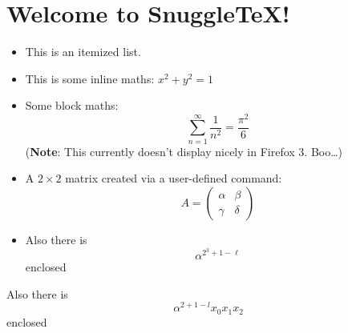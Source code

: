\section*{Welcome to SnuggleTeX!}

\begin{itemize}
  \item This is an itemized list.

  \item This is some inline maths: $x^2+ y^2 = 1$

  \item Some block maths:
        \[ \sum_{n=1}^\infty \frac{1}{n^2} = \frac{\pi^2}{6} \]
        (\textbf{Note}: This currently doesn't display nicely in Firefox 3. Boo\ldots)

  \item A $2\times 2$ matrix created via a user-defined command:
        \newcommand{\mat}[4]{\left( \begin{array}{cc} #1 & #2 \\ #3 & #4 \end{array} \right)}
        \[ A = \mat{\alpha}{\beta}{\gamma}{\delta} \]

  \item Also there is $$ \alpha^{2^{3}+1-\ell} $$ enclosed

\end{itemize}

Also there is $$ \alpha^{2+1-l} x_{0} x_{1} x_2 $$ enclosed
